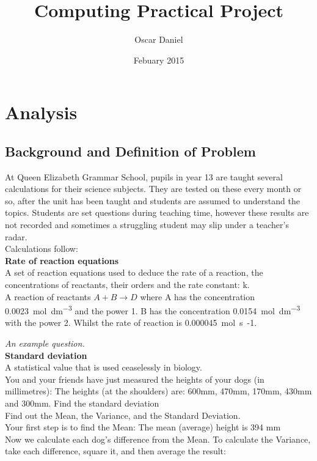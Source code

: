 \documentclass[a4paper,12pt]{report}
\title{Computing Practical Project}
\author{Oscar Daniel}
\date{Febuary 2015 }
\begin{document}
\maketitle
\tableofcontents

\chapter{Analysis}

\section{Background and Definition of Problem}
\begin{flushleft}
At Queen Elizabeth Grammar School, pupils in year 13 are taught several calculations for their science subjects. They are tested on these every month or so, after the unit has been taught and students are assumed to understand the topics. Students are set questions during teaching time, however these results are not recorded and sometimes a struggling student may slip under a teacher’s radar.
\\Calculations follow:\\
\textbf{Rate of reaction equations}\\
A set of reaction equations used to deduce the rate of a reaction, the concentrations of reactants, their orders and the rate constant: k. \\
A reaction of reactants $A + B \rightarrow D $ where A has the concentration \SI{0.0023}{mol.dm^{-3}} and the power 1. B has the concentration \SI{0.0154}{mol.dm^{-3}}
with the power 2. Whilst the rate of reaction is \SI{0.000045}{mol.s{-1}}.

\emph{An example question.}	\\
\textbf{Standard deviation}\\
 A statistical value that is used ceaselessly in biology.\\
         You and your friends have just measured the heights of your dogs (in millimetres):
         The heights (at the shoulders) are: 600mm, 470mm, 170mm, 430mm and 300mm.
	Find the standard deviation\\
Find out the Mean, the Variance, and the Standard Deviation.\\
Your first step is to find the Mean:
The mean (average) height is 394 mm\\
Now we calculate each dog's difference from the Mean. To calculate the Variance, take each difference, square it, and then average the result:


\end{flushleft}
\end{document}
